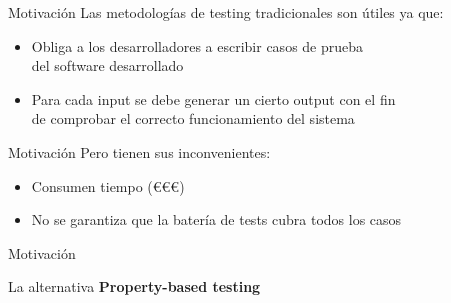 \documentclass{beamer}
\begin{document}
    \begin{frame}{Motivación}
      Las metodologías de testing tradicionales son útiles ya que:
      \begin{itemize}
        \item Obliga a los desarrolladores a escribir casos de prueba\\
        del software desarrollado
        \item Para cada input se debe generar un cierto output con el fin\\
        de comprobar el correcto funcionamiento del sistema
      \end{itemize}
    \end{frame}

    \begin{frame}{Motivación}
      Pero tienen sus inconvenientes:
      \begin{itemize}
        \item Consumen tiempo (€€€)
        \item No se garantiza que la batería de tests cubra todos los casos
      \end{itemize}
    \end{frame}

    \begin{frame}{Motivación}
      \begin{exampleblock}{La alternativa}
        \textbf{Property-based testing}
      \end{exampleblock}
    \end{frame}
\end{document}
